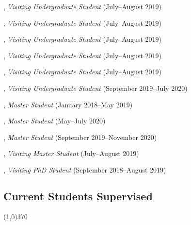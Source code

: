 \documentclass[10pt]{article}
\newenvironment{myindentpar}[1]%
{\begin{list}{}%
         {\setlength{\leftmargin}{#1}}%
         \item[]%
}
{\end{list}}
\newcounter{list}
\begin{document}
\begin{myindentpar}{0.75cm}
\hspace{-0.75cm}{\bf Wei Peng}, \textit{Visiting Undergraduate Student} (July--August 2019)

\hspace{-0.75cm}{\bf Ms. Mengxia Yu}, \textit{Visiting Undergraduate Student} (July--August 2019)

\hspace{-0.75cm}{\bf Ms. Kaifeng Yu}, \textit{Visiting Undergraduate Student} (July--August 2019)

\hspace{-0.75cm}{\bf Zhihan Zhang}, \textit{Visiting Undergraduate Student} (July--August 2019)

\hspace{-0.75cm}{\bf Ms. Yang Zhou}, \textit{Visiting Undergraduate Student} (July--August 2019)

\hspace{-0.75cm}{\bf Zaitang Li}, \textit{Visiting Undergraduate Student} (September 2019--July 2020)

\hspace{-0.75cm}{\bf Ms. Xueying Wang}, \textit{Master Student} (January 2018--May 2019)

\hspace{-0.75cm}{\bf Ms. Bhakti Sharma}, \textit{Master Student} (May--July 2020)

\hspace{-0.75cm}{\bf Jianing Li}, \textit{Master Student} (September 2019--November 2020)

\hspace{-0.75cm}{\bf Zijian Hu}, \textit{Visiting Master Student} (July--August 2019)

\hspace{-0.75cm}{\bf Tianwen Jiang}, \textit{Visiting PhD Student} (September 2018--August 2019)

\end{myindentpar}

\subsection{\sc Current Students Supervised}
\vspace{-0.4cm} \line(1,0){370} \vspace{-0.1cm}
\end{document}
